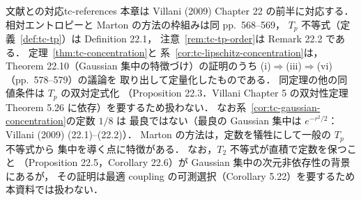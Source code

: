 \begin{remark}{文献との対応}{tc-references}
  本章は Villani (2009) Chapter 22 の前半に対応する．
  相対エントロピーと Marton の方法の枠組みは同 pp.~568--569，
  $T_p$ 不等式（定義~\ref{def:tc-tp}）は Definition 22.1，
  注意~\ref{rem:tc-tp-order}は Remark 22.2 である．
  定理~\ref{thm:tc-concentration}と
  系~\ref{cor:tc-lipschitz-concentration}は，
  Theorem 22.10（Gaussian 集中の特徴づけ）の証明のうち
  (i)$\Rightarrow$(iii)$\Rightarrow$(vi)（pp.~578--579）の議論を
  取り出して定量化したものである．
  同定理の他の同値条件は $T_p$ の双対定式化
  （Proposition 22.3．Villani Chapter 5 の双対性定理
  Theorem 5.26 に依存）を要するため扱わない．
  なお系~\ref{cor:tc-gaussian-concentration}の定数 $1/8$ は
  最良ではない（最良の Gaussian 集中は $e^{-r^2/2}$：
  Villani (2009) (22.1)--(22.2)）．
  Marton の方法は，定数を犠牲にして一般の $T_p$ 不等式から
  集中を導く点に特徴がある．
  なお，$T_2$ 不等式が直積で定数を保つこと
  （Proposition 22.5，Corollary 22.6）が
  Gaussian 集中の次元非依存性の背景にあるが，
  その証明は最適 coupling の可測選択（Corollary 5.22）を要するため
  本資料では扱わない．
\end{remark}

